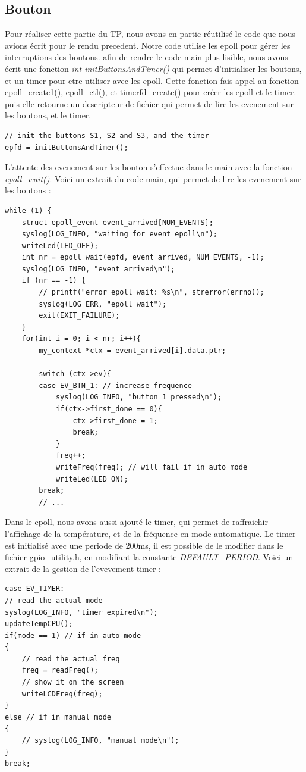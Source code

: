\documentclass[
	a4paper, %
	10pt, %
]{CSUniSchoolLabReport}
\begin{document}
\subsection{Bouton}\label{Bouton}
Pour réaliser cette partie du TP, nous avons en partie réutilisé le code que nous avions écrit pour le rendu precedent.
Notre code utilise les epoll pour gérer les interruptions des boutons.
afin de rendre le code main plus lisible, nous avons écrit une fonction \textit{int initButtonsAndTimer()} qui permet d'initialiser les boutons, et un timer pour etre utiliser avec les epoll.
Cette fonction fais appel au fonction epoll\_create1(), epoll\_ctl(), et timerfd\_create() pour créer les epoll et le timer.
puis elle retourne un descripteur de fichier qui permet de lire les evenement sur les boutons, et le timer.
\begin{lstlisting}[style=CStyle]
// init the buttons S1, S2 and S3, and the timer
epfd = initButtonsAndTimer();
\end{lstlisting}
L'attente des evenement sur les bouton s'effectue dans le main avec la fonction \textit{epoll\_wait()}.
Voici un extrait du code main, qui permet de lire les evenement sur les boutons : \\
\begin{lstlisting}[style=CStyle]
while (1) {
	struct epoll_event event_arrived[NUM_EVENTS];
	syslog(LOG_INFO, "waiting for event epoll\n");
	writeLed(LED_OFF);
	int nr = epoll_wait(epfd, event_arrived, NUM_EVENTS, -1);
	syslog(LOG_INFO, "event arrived\n");
	if (nr == -1) {
		// printf("error epoll_wait: %s\n", strerror(errno));
		syslog(LOG_ERR, "epoll_wait");
		exit(EXIT_FAILURE);
	}
	for(int i = 0; i < nr; i++){
		my_context *ctx = event_arrived[i].data.ptr;

		switch (ctx->ev){
		case EV_BTN_1: // increase frequence
			syslog(LOG_INFO, "button 1 pressed\n");
			if(ctx->first_done == 0){
				ctx->first_done = 1;
				break;
			}
			freq++;
			writeFreq(freq); // will fail if in auto mode
			writeLed(LED_ON);
		break;
		// ...
\end{lstlisting}

Dans le epoll, nous avons aussi ajouté le timer, qui permet de raffraichir l'affichage de la température, et de la fréquence en mode automatique.
Le timer est initialisé avec une periode de 200ms, il est possible de le modifier dans le fichier gpio\_utility.h, en modifiant la constante \textit{DEFAULT\_PERIOD}.
Voici un extrait de la gestion de l'evevement timer : \\
\begin{lstlisting}[style=CStyle]
case EV_TIMER:
// read the actual mode
syslog(LOG_INFO, "timer expired\n");
updateTempCPU();
if(mode == 1) // if in auto mode
{
	// read the actual freq
	freq = readFreq();
	// show it on the screen
	writeLCDFreq(freq); 
}
else // if in manual mode
{
	// syslog(LOG_INFO, "manual mode\n");
}
break;
\end{lstlisting}
\end{document}
